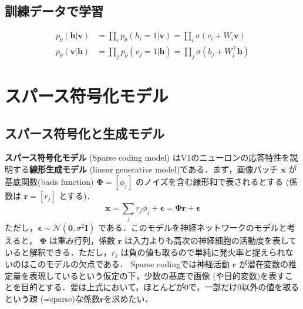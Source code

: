 \subsection{訓練データで学習}
\begin{align}
p_\theta(\mathbf{h}|\mathbf{v})&=\prod_i p_\theta(h_i=1|\mathbf{v})=\prod_i \sigma(c_i + W_i \mathbf{v})\\
p_\theta(\mathbf{v}|\mathbf{h})&=\prod_j p_\theta(v_j=1|\mathbf{h})=\prod_j \sigma(b_j + W_j^\top \mathbf{h})
\end{align}
\section{スパース符号化モデル}
\subsection{スパース符号化と生成モデル}
\textbf{スパース符号化モデル} (Sparse coding model) \citep{Olshausen1996-xe} \citep{Olshausen1997-qu}はV1のニューロンの応答特性を説明する\textbf{線形生成モデル} (linear generative model)である．まず，画像パッチ $\mathbf{x}$ が基底関数(basis function) $\mathbf{\Phi} = [\phi_j]$ のノイズを含む線形和で表されるとする (係数は $\mathbf{r}=[r_j]$ とする)．
\begin{equation}
\mathbf{x} = \sum_j r_j \phi_j +\boldsymbol{\epsilon}= \mathbf{\Phi} \mathbf{r}+ \boldsymbol{\epsilon}
\end{equation}
ただし，$\boldsymbol{\epsilon} \sim \mathcal{N}(\mathbf{0}, \sigma^2 \mathbf{I})$ である．このモデルを神経ネットワークのモデルと考えると， $\mathbf{\Phi}$ は重み行列，係数 $\mathbf{r}$ は入力よりも高次の神経細胞の活動度を表していると解釈できる．ただし，$r_j$ は負の値も取るので単純に発火率と捉えられないのはこのモデルの欠点である．
Sparse codingでは神経活動 $\mathbf{r}$ が潜在変数の推定量を表現しているという仮定の下，少数の基底で画像 (や目的変数)を表すことを目的とする．要は上式において，ほとんどが0で，一部だけ0以外の値を取るという疎 (=sparse)な係数$\mathbf{r}$を求めたい．
